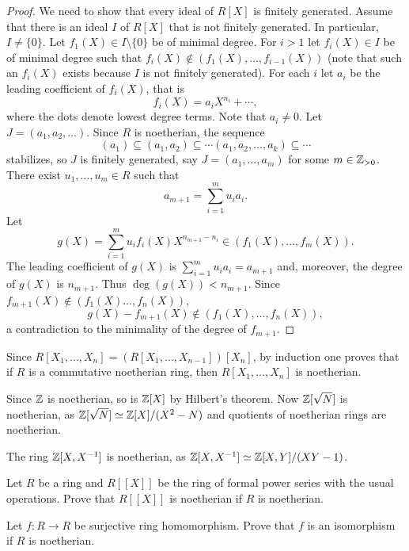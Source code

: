 \begin{proof}
	We need to show that every ideal of $R[X]$ is finitely generated. Assume that
	there is an ideal $I$ of $R[X]$ that is not finitely generated. In particular, $I\ne\{0\}$. 
	Let $f_1(X)\in I\setminus\{0\}$ be of minimal degree. For $i>1$ let 
	$f_i(X)\in I$ be of minimal degree such that $f_i(X)\not\in(f_1(X),\dots,f_{i-1}(X))$ (note
	that such an $f_i(X)$ exists because $I$ is not finitely generated). For each $i$ 
	let $a_i$ be the leading coefficient of $f_i(X)$, that is
	\[
	f_i(X)=a_iX^{n_i}+\cdots,
	\]
	where the dots denote lowest degree terms. Note that 
	$a_i\ne 0$.
	Let $J=(a_1,a_2,\dots)$. Since $R$ is noetherian, the sequence
	\[
	(a_1)\subseteq (a_1,a_2)\subseteq\cdots(a_1,a_2,\dots,a_k)\subseteq\cdots
	\]
	stabilizes, so $J$ is finitely generated, say
	$J=(a_1,\dots,a_m)$ for some $m\in\mathbb{Z}_{>0}$. 
	There exist $u_1,\dots,u_m\in R$ such that 
	\[
	a_{m+1}=\sum_{i=1}^m u_ia_i.
	\]
	Let 
	\[
	g(X)=\sum_{i=1}^mu_if_i(X)X^{n_{m+1}-n_i}\in (f_1(X),\dots,f_m(X)).
	\]
	The leading coefficient of $g(X)$ is $\sum_{i=1}^mu_ia_i=a_{m+1}$ and, moreover, 
	the degree of $g(X)$ is $n_{m+1}$. Thus $\deg(g(X))<n_{m+1}$. 
	Since $f_{m+1}(X)\not\in (f_1(X)\dots,f_n(X))$, 
	\[
	g(X)-f_{m+1}(X)\not\in (f_1(X),\dots,f_n(X)),
	\]
	a contradiction to the minimality of the degree of $f_{m+1}$.  
\end{proof}

Since $R[X_1,\dots,X_n]=(R[X_1,\dots,X_{n-1}])[X_n]$, by induction 
one proves that if $R$ is a commutative noetherian ring, 
then $R[X_1,\dots,X_n]$ is noetherian. 
 
\begin{example}
	Since $\mathbb{Z}$ is noetherian, so is $\mathbb{Z}[X]$ by Hilbert's theorem. Now 
	$\mathbb{Z}[\sqrt{N}]$ is noetherian, as $\mathbb{Z}[\sqrt{N}]\simeq\mathbb{Z}[X]/(X^2-N)$ and quotients
	of noetherian rings are noetherian.  	
\end{example}

\begin{example}
	The ring $\mathbb{Z}[X,X^{-1}]$ is noetherian, as $\mathbb{Z}[X,X^{-1}]\simeq\mathbb{Z}[X,Y]/(XY-1)$. 
\end{example}
 
 
\begin{exercise}
    Let $R$ be a ring and $R[[X]]$ be the ring of formal power series with the usual operations.  
	Prove that $R[[X]]$ is noetherian if $R$ is noetherian. 	
\end{exercise}

\begin{exercise}
	Let $f\colon R\to R$ be surjective ring homomorphism. Prove that $f$ is an isomorphism
	if $R$ is noetherian. 	
\end{exercise}




